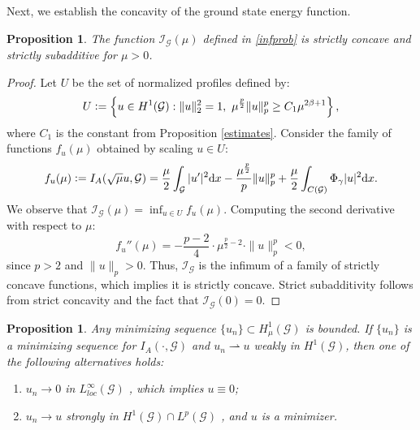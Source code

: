 \documentclass[12pt,a4paper]{amsart}
\theoremstyle{definition}
\theoremstyle{plain}
\newtheorem{proposition}[definition]{Proposition}
\newcommand{\defeq}{\vcentcolon=}
\numberwithin{equation}{section}
\begin{document}
Next, we establish the concavity of the ground state energy function.

\begin{proposition}
The function $\mathcal{I}_\mathcal{G}(\mu)$ defined in \eqref{infprob} is strictly concave and strictly subadditive for $\mu > 0$.
\end{proposition}

\begin{proof}
Let $U$ be the set of normalized profiles defined by:
\begin{equation}
    U \defeq \left\{ u \in H^1(\mathcal{G}) : \|u\|_2^2= 1, \ \mu^{\frac{p}{2}} \|u\|_p^p \geq C_1 \mu^{2 \beta +1} \right\},
\end{equation}
where $C_1$ is the constant from Proposition \ref{estimates}. 
Consider the family of functions $f_u(\mu)$ obtained by scaling $u \in U$:
\begin{equation}
    f_u(\mu) \defeq I_A(\sqrt{\mu} u, \mathcal{G}) = \frac{\mu}{2} \int_{\mathcal{G}} |u'|^2 \mathrm{d}x - \frac{\mu^{\frac{p}{2}}}{p} \|u\|_p^p + \frac{\mu}{2} \int_{C(\mathcal{G})}\Phi_{\gamma} |u|^2 \mathrm{d}x.
\end{equation}
We observe that $\mathcal{I}_\mathcal{G}(\mu) = \inf_{u \in U} f_u(\mu)$. Computing the second derivative with respect to $\mu$:
\begin{equation}
  f_u''(\mu) = - \frac{p-2}{4} \cdot \mu^{\frac{p}{2} -2} \cdot \|u\|_p^p  < 0,
\end{equation}
since $p > 2$ and $\|u\|_p > 0$. Thus, $\mathcal{I}_\mathcal{G}$ is the infimum of a family of strictly concave functions, which implies it is strictly concave. Strict subadditivity follows from strict concavity and the fact that $\mathcal{I}_{\mathcal{G}}(0) = 0$.
\end{proof}

\begin{proposition} \label{minseq}
Any minimizing sequence $\{ u_n\} \subset H^1_{\mu}(\mathcal{G})$ is bounded. If $\{u_n\}$ is a minimizing sequence for $I_A(\cdot, \mathcal{G})$ and $u_n \rightharpoonup u $ weakly in $H^1(\mathcal{G})$, then one of the following alternatives holds:
\begin{enumerate}
    \item[(i)] $u_n \rightarrow 0$ in $L^{\infty}_{loc}(\mathcal{G})$ , which implies $u \equiv 0$;
    \item[(ii)] $u_n \rightarrow u$ strongly in $H^1(\mathcal{G}) \cap L^p(\mathcal{G})$ , and $u$ is a minimizer.
\end{enumerate}
\end{proposition} 
\end{document}
